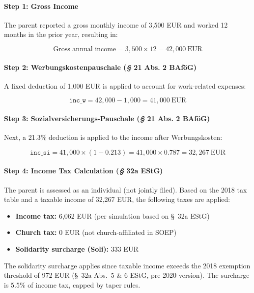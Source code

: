 \paragraph{Step 1: Gross Income}

The parent reported a gross monthly income of 3,500 EUR and worked 12 months in the prior year, resulting in:

\[
\text{Gross annual income} = 3{,}500 \times 12 = 42{,}000~\text{EUR}
\]

\paragraph{Step 2: Werbungskostenpauschale (\textit{§} 21 Abs. 2 BAföG)}

A fixed deduction of 1,000 EUR is applied to account for work-related expenses:

\[
\texttt{inc\_w} = 42{,}000 - 1{,}000 = 41{,}000~\text{EUR}
\]

\paragraph{Step 3: Sozialversicherungs-Pauschale (\textit{§} 21 Abs. 2 BAföG)}

Next, a 21.3\% deduction is applied to the income after Werbungskosten:

\[
\texttt{inc\_si} = 41{,}000 \times (1 - 0.213) = 41{,}000 \times 0.787 = 32{,}267~\text{EUR}
\]

\paragraph{Step 4: Income Tax Calculation (\textit{§} 32a EStG)}

The parent is assessed as an individual (not jointly filed). Based on the 2018 tax table and a taxable income of 32,267 EUR, the following taxes are applied:

\begin{itemize}
    \item \textbf{Income tax:} 6,062 EUR (per simulation based on §~32a EStG)
    \item \textbf{Church tax:} 0 EUR (not church-affiliated in SOEP)
    \item \textbf{Solidarity surcharge (Soli):} 333 EUR
\end{itemize}


The solidarity surcharge applies since taxable income exceeds the 2018 exemption threshold of 972 EUR (§~32a Abs.~5 \& 6 EStG, pre-2020 version). The surcharge is 5.5\% of income tax, capped by taper rules.

